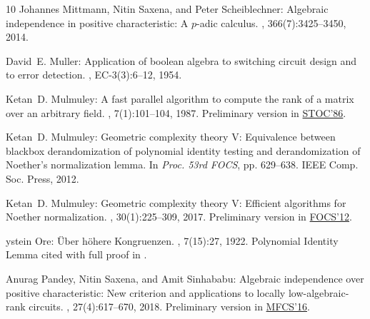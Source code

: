 \documentclass[11pt]{article}
\numberwithin{equation}{section}
\theoremstyle{definition}
\theoremstyle{plain}
\begin{document}
\begin{thebibliography}{10}
{\sc Johannes Mittmann, Nitin Saxena, and Peter Scheiblechner}: Algebraic
  independence in positive characteristic: {A} $p$-adic calculus.
, 366(7):3425--3450, 2014.

{\sc David~E. Muller}: Application of boolean algebra to switching circuit
  design and to error detection.
, EC-3(3):6--12, 1954.

{\sc Ketan~D. Mulmuley}: A fast parallel algorithm to compute the rank of a
  matrix over an arbitrary field.
, 7(1):101--104, 1987.
\newblock Preliminary version in
  \href{https://dl.acm.org/citation.cfm?id=12164}{STOC'86}.
\newblock [\epfmtdoi{10.1007/BF02579205}]

{\sc Ketan~D. Mulmuley}: Geometric complexity theory {V}: {E}quivalence between
  blackbox derandomization of polynomial identity testing and derandomization
  of {N}oether's normalization lemma.
\newblock In {\em Proc. 53rd FOCS}, pp. 629--638. IEEE Comp. Soc. Press, 2012.

{\sc Ketan~D. Mulmuley}: Geometric complexity theory {V}: {E}fficient
  algorithms for {Noether} normalization.
, 30(1):225--309, 2017.
\newblock Preliminary version in
  \href{https://doi.org/10.1109/FOCS.2012.15}{FOCS'12}.

{\sc {\O}ystein Ore}: {\"U}ber h{\"o}here {K}ongruenzen.
, 7(15):27, 1922.
\newblock Polynomial Identity Lemma cited with full proof in \cite[Theorem
  6.13]{lidl}.

{\sc Anurag Pandey, Nitin Saxena, and Amit Sinhababu}: Algebraic independence
  over positive characteristic: {N}ew criterion and applications to locally
  low-algebraic-rank circuits.
, 27(4):617--670, 2018.
\newblock Preliminary version in
  \href{https://doi.org/10.4230/LIPIcs.MFCS.2016.74}{MFCS'16}.
\newblock [\epfmtdoi{10.1007/s00037-018-0167-5}]


\end{thebibliography}
\end{document}
